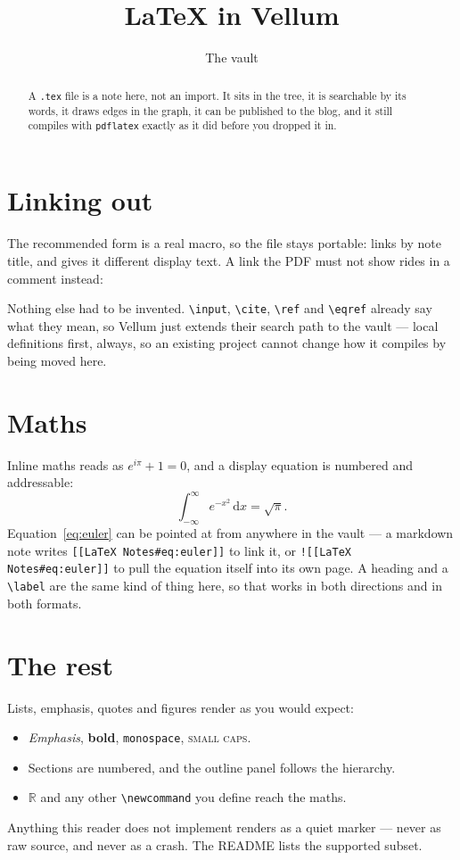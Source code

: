 \documentclass{article}
\title{LaTeX in Vellum}
\author{The vault}
\newcommand{\R}{\mathbb{R}}
\begin{document}
\maketitle

\begin{abstract}
  A \texttt{.tex} file is a note here, not an import. It sits in the tree, it
  is searchable by its words, it draws edges in the graph, it can be published
  to the blog, and it still compiles with \texttt{pdflatex} exactly as it did
  before you dropped it in.
\end{abstract}

\section{Linking out}\label{sec:linking}
The recommended form is a real macro, so the file stays portable:
 links by note title, and
 gives it different display text. A link the
PDF must not show rides in a comment instead:

Nothing else had to be invented. \texttt{\textbackslash input}, \texttt{\textbackslash cite},
\texttt{\textbackslash ref} and \texttt{\textbackslash eqref} already say what they mean, so Vellum
just extends their search path to the vault --- local definitions first, always,
so an existing project cannot change how it compiles by being moved here.

\section{Maths}\label{sec:maths}
Inline maths reads as $e^{i\pi} + 1 = 0$, and a display equation is numbered
and addressable:
\begin{equation}\label{eq:euler}
  \int_{-\infty}^{\infty} e^{-x^{2}}\,\mathrm{d}x = \sqrt{\pi}.
\end{equation}
Equation~\eqref{eq:euler} can be pointed at from anywhere in the vault --- a
markdown note writes \texttt{[[LaTeX Notes\#eq:euler]]} to link it, or
\texttt{![[LaTeX Notes\#eq:euler]]} to pull the equation itself into its own
page. A heading and a \texttt{\textbackslash label} are the same kind of thing here, so that
works in both directions and in both formats.

\section{The rest}\label{sec:rest}
Lists, emphasis, quotes and figures render as you would expect:
\begin{itemize}
  \item \emph{Emphasis}, \textbf{bold}, \texttt{monospace}, \textsc{small caps}.
  \item Sections are numbered, and the outline panel follows the hierarchy.
  \item $\R$ and any other \texttt{\textbackslash newcommand} you define reach the maths.
\end{itemize}

\begin{theorem}\label{thm:honest}
  Anything this reader does not implement renders as a quiet marker --- never
  as raw source, and never as a crash. The README lists the supported subset.
\end{theorem}
\end{document}
